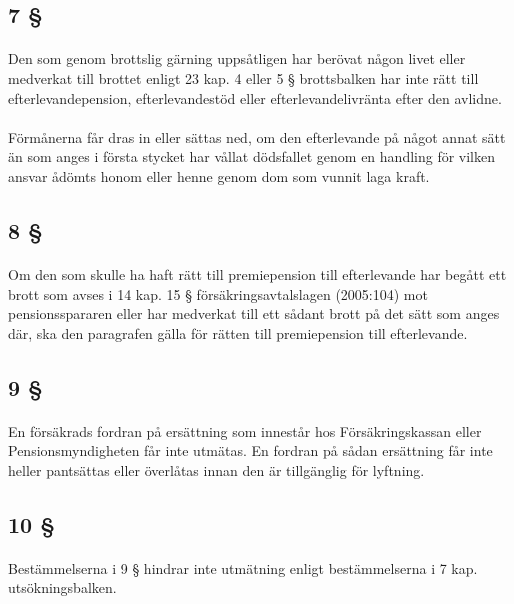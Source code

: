 \documentclass[a4paper,notitlepage,openany,10pt]{book}
\begin{document}
\subsection*{7 §}
\paragraph*{}
Den som genom brottslig gärning uppsåtligen har berövat någon livet eller medverkat till brottet enligt 23 kap. 4 eller 5 § brottsbalken har inte rätt till efterlevandepension, efterlevandestöd eller efterlevandelivränta efter den avlidne.
\paragraph*{}
Förmånerna får dras in eller sättas ned, om den efterlevande på något annat sätt än som anges i första stycket har vållat dödsfallet genom en handling för vilken ansvar ådömts honom eller henne genom dom som vunnit laga kraft.
\subsection*{8 §}
\paragraph*{}
Om den som skulle ha haft rätt till premiepension till efterlevande har begått ett brott som avses i 14 kap. 15 § försäkringsavtalslagen (2005:104) mot pensionsspararen eller har medverkat till ett sådant brott på det sätt som anges där, ska den paragrafen gälla för rätten till premiepension till efterlevande.
\subsection*{9 §}
\paragraph*{}
En försäkrads fordran på ersättning som innestår hos Försäkringskassan eller Pensionsmyndigheten får inte utmätas.
En fordran på sådan ersättning får inte heller pantsättas eller överlåtas innan den är tillgänglig för lyftning.
\subsection*{10 §}
\paragraph*{}
Bestämmelserna i 9 § hindrar inte utmätning enligt bestämmelserna i 7 kap. utsökningsbalken.
\end{document}
